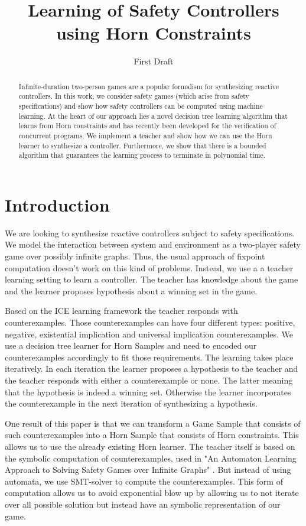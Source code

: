 \documentclass[10pt,a4paper]{article}
\author{First Draft}
\title{Learning of Safety Controllers using Horn Constraints}
\theoremstyle{plain}
\theoremstyle{definition}
\begin{document}
\maketitle

\begin{abstract}
Infinite-duration two-person games are a popular formalism for synthesizing reactive controllers. In this work, we consider safety games (which arise from safety specifications) and show how safety controllers can be computed using machine learning. At the heart of our approach lies a novel decision tree learning algorithm that learns from Horn constraints and has recently been developed for the verification of concurrent programs. We implement a teacher and show how we can use the Horn learner to synthesize a controller. Furthermore, we show that there is a bounded algorithm that guarantees the learning process to terminate in polynomial time.
\end{abstract}

\section{Introduction}

We are looking to synthesize reactive controllers subject to safety specifications. We model the interaction between system and environment as a two-player safety game over possibly infinite graphs. Thus, the usual approach of fixpoint computation doesn't work on this kind of problems. Instead, we use a a teacher learning setting to learn a controller. The teacher has knowledge about the game and the learner proposes hypothesis about a winning set in the game. 

Based on the ICE learning framework the teacher responds with counterexamples. Those counterexamples can have four different types: positive, negative, existential implication and universal implication counterexamples. We use a decision tree learner for Horn Samples and need to encoded our counterexamples accordingly to fit those requirements. The learning takes place iteratively. In each iteration the learner proposes a hypothesis to the teacher and the teacher responds with either a counterexample or none. The latter meaning that the hypothesis is indeed a winning set. Otherwise the learner incorporates the counterexample in the next iteration of synthesizing a hypothesis.  

One result of this paper is that we can transform a Game Sample that consists of such counterexamples into a Horn Sample that consists of Horn constraints. This allows us to use the already existing Horn learner\cite{d2017horn}. The teacher itself is based on the symbolic computation of counterexamples, used in "An Automaton Learning Approach to Solving Safety Games over Infinite Graphs" \cite{neider2016automaton}. But instead of using automata, we use SMT-solver to compute the counterexamples. This form of computation allows us to avoid exponential blow up by allowing us to not iterate over all possible solution but instead have an symbolic representation of our game.
\end{document}
